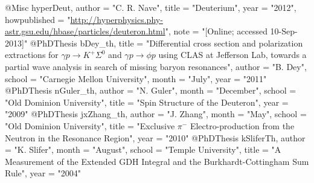 @Misc{ hyperDeut,
  author = "C. R. Nave",
  title = "Deuterium",
  year = "2012",
  howpublished = "\url{http://hyperphysics.phy-astr.gsu.edu/hbase/particles/deuteron.html}",
  note = "[Online; accessed 10-Sep-2013]"
}
@PhDThesis{ bDey_th,
	title = "{Differential cross section and polarization extractions for $\gamma p \rightarrow K^{+} \Sigma^{0}$ and $\gamma p \rightarrow \phi p$ using CLAS at Jefferson Lab, towards a partial wave analysis in search of missing baryon resonances}",
	author = "B. Dey",
	school = "Carnegie Mellon University",
	month = "July",
	year = "2011"
}
@PhDThesis{ nGuler_th,
	author = "N. Guler",
	month = "December",
	school = "Old Dominion University",
	title = "{Spin Structure of the Deuteron}",
	year = "2009"
}
@PhDThesis{ jxZhang_th,
	author = "J. Zhang",
	month = "May",
	school = "Old Dominion University",
	title = "{Exclusive $\pi^-$ Electro-production from the Neutron in the Resonance Region}",
	year = "2010"
}
@PhDThesis{ kSliferTh,
	author = "K. Slifer",
	month = "August",
	school = "Temple University",
	title = "{A Measurement of the Extended GDH Integral and the Burkhardt-Cottingham Sum Rule}",
	year = "2004"
}

